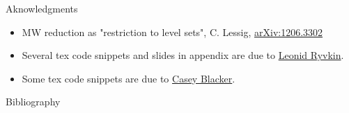\documentclass[handout,10pt]{beamer}
\begin{document}
\begin{frame}[t,allowframebreaks]{Aknowledgments}
	\begin{itemize}
		\item MW reduction as "restriction to level sets", C. Lessig,
			\href{https://arxiv.org/abs/1206.3302}{arXiv:1206.3302}
		\item Several tex code snippets and slides in appendix are due to \href{https://www.ryvkin.eu/}{Leonid Ryvkin}.
		\item Some tex code snippets are due to \href{https://math.gmu.edu/~cblacke/}{Casey Blacker}.
		
	\end{itemize}
\end{frame}



\begin{frame}[t,allowframebreaks]{Bibliography}
	\printbibliography
\end{frame}

\end{document}
